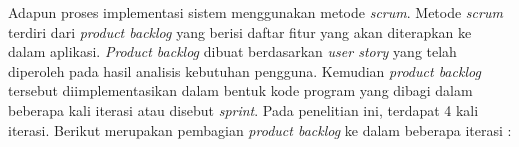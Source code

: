 \par Adapun proses implementasi sistem menggunakan metode \textit{scrum}. Metode \textit{scrum} terdiri dari \textit{product backlog} yang berisi daftar fitur yang akan diterapkan ke dalam aplikasi. \textit{Product backlog} dibuat berdasarkan \textit{user story} yang telah diperoleh pada hasil analisis kebutuhan pengguna. Kemudian \textit{product backlog} tersebut diimplementasikan dalam bentuk kode program yang dibagi dalam beberapa kali iterasi atau disebut \textit{sprint}. Pada penelitian ini, terdapat 4 kali iterasi. Berikut merupakan pembagian \textit{product backlog} ke dalam beberapa iterasi :




